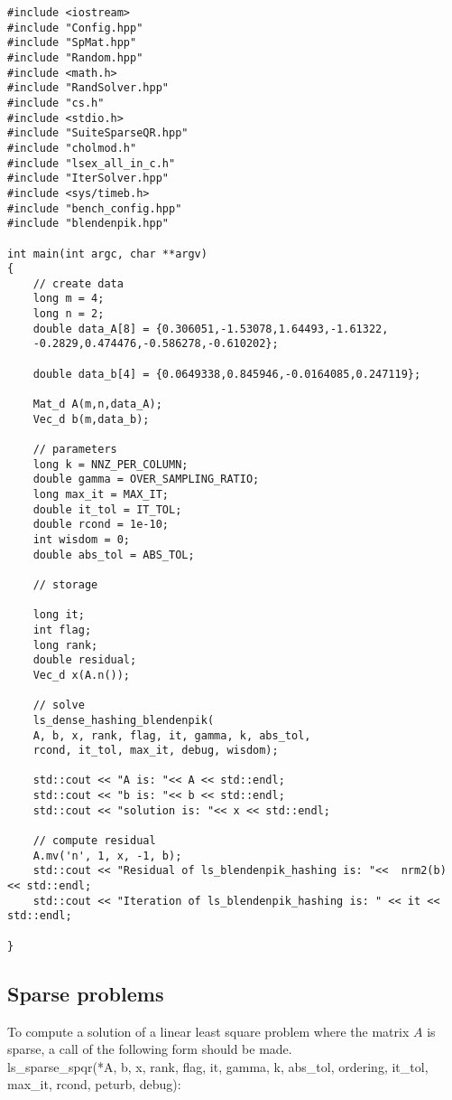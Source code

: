 \documentclass[english,11pt]{article}
\begin{document}
\begin{lstlisting}
#include <iostream>
#include "Config.hpp"
#include "SpMat.hpp"
#include "Random.hpp"
#include <math.h>
#include "RandSolver.hpp"
#include "cs.h"
#include <stdio.h> 
#include "SuiteSparseQR.hpp"
#include "cholmod.h"
#include "lsex_all_in_c.h"
#include "IterSolver.hpp"
#include <sys/timeb.h>
#include "bench_config.hpp"
#include "blendenpik.hpp"

int main(int argc, char **argv)
{
	// create data
	long m = 4;
	long n = 2;
	double data_A[8] = {0.306051,-1.53078,1.64493,-1.61322,
	-0.2829,0.474476,-0.586278,-0.610202};

	double data_b[4] = {0.0649338,0.845946,-0.0164085,0.247119};

	Mat_d A(m,n,data_A);
	Vec_d b(m,data_b);

	// parameters
	long k = NNZ_PER_COLUMN;
	double gamma = OVER_SAMPLING_RATIO;
	long max_it = MAX_IT;
	double it_tol = IT_TOL;
	double rcond = 1e-10;
	int wisdom = 0;
	double abs_tol = ABS_TOL;

	// storage

	long it;
	int flag;
	long rank;
	double residual;   
	Vec_d x(A.n());

	// solve
	ls_dense_hashing_blendenpik(
	A, b, x, rank, flag, it, gamma, k, abs_tol, 
	rcond, it_tol, max_it, debug, wisdom);

	std::cout << "A is: "<< A << std::endl;
	std::cout << "b is: "<< b << std::endl;
	std::cout << "solution is: "<< x << std::endl;

	// compute residual
	A.mv('n', 1, x, -1, b); 
	std::cout << "Residual of ls_blendenpik_hashing is: "<<  nrm2(b) << std::endl;
	std::cout << "Iteration of ls_blendenpik_hashing is: " << it << std::endl;

}
\end{lstlisting}


\subsection{Sparse problems}

To compute a solution of a linear least square problem where the matrix $A$ is sparse, a call of the following form should be made. \\

ls_sparse_spqr(*A, b, x, 
    rank, flag, it, gamma, k, abs_tol, ordering, it_tol, max_it, rcond, peturb, debug):
\end{document}
